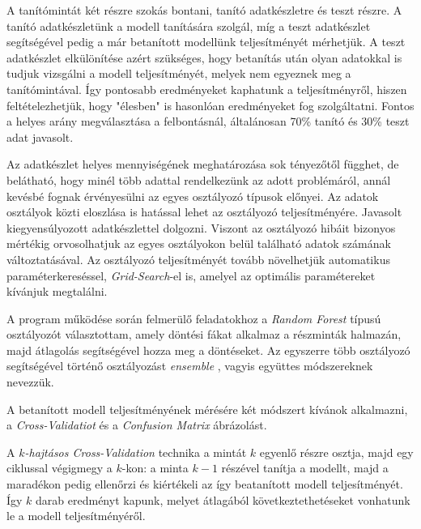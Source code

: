 A tanítómintát két részre szokás bontani, tanító adatkészletre és teszt részre. A tanító adatkészletünk a modell tanítására szolgál, míg a teszt adatkészlet segítségével pedig a már betanított modellünk teljesítményét mérhetjük. A teszt adatkészlet elkülönítése azért szükséges, hogy betanítás után olyan adatokkal is tudjuk vizsgálni a modell teljesítményét, melyek nem egyeznek meg a tanítómintával. Így pontosabb eredményeket kaphatunk a teljesítményről, hiszen feltételezhetjük, hogy "élesben" is hasonlóan eredményeket fog szolgáltatni. Fontos a helyes arány megválasztása a felbontásnál, általánosan 70\% tanító és 30\% teszt adat javasolt. \cite{geron2019hands}

Az adatkészlet helyes mennyiségének meghatározása sok tényezőtől függhet, de belátható, hogy minél több adattal rendelkezünk az adott problémáról, annál kevésbé fognak érvényesülni az egyes osztályozó típusok előnyei. \cite{geron2019hands} Az adatok osztályok közti eloszlása is hatással lehet az osztályozó teljesítményére. Javasolt kiegyensúlyozott adatkészlettel dolgozni. Viszont az osztályozó hibáit bizonyos mértékig orvosolhatjuk az egyes osztályokon belül található adatok számának változtatásával. Az osztályozó teljesítményét tovább növelhetjük automatikus paraméterkereséssel, \textit{Grid-Search}-el is, amelyel az optimális paramétereket kívánjuk megtalálni. \cite{koesmarno2019class}

A program működése során felmerülő feladatokhoz a \textit{Random Forest} típusú osztályozót választottam, amely döntési fákat alkalmaz a részminták halmazán, majd átlagolás segítségével hozza meg a döntéseket. Az egyszerre több osztályozó segítségével történő osztályozást \textit{ensemble} \cite{geron2019hands}, vagyis együttes módszereknek nevezzük.

A betanított modell teljesítményének mérésére két módszert kívánok alkalmazni, a \textit{Cross-Validatiot} és a \textit{Confusion Matrix} ábrázolást.


A \textit{$k$-hajtásos Cross-Validation} technika a mintát $k$ egyenlő részre osztja, majd egy ciklussal végigmegy a $k$-kon: a minta $k-1$ részével tanítja a modellt, majd a maradékon pedig ellenőrzi és kiértékeli az így beatanított modell teljesítményét. Így $k$ darab eredményt kapunk, melyet átlagából következtethetéseket vonhatunk le a modell teljesítményéről.

